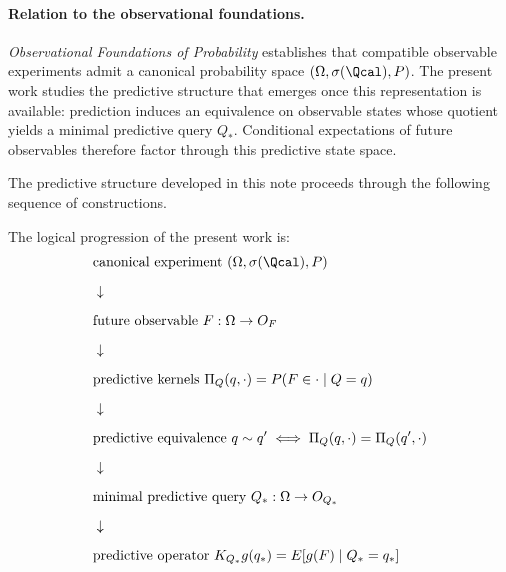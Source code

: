 
\maketitle

\begin{abstract}
Building on the canonical probability space representation established
in \emph{Observational Foundations of Probability}, this work studies
the predictive structure that emerges from compatible observable
experiments.

Given a future observable $F:\Omega\to O_F$, prediction induces an
equivalence relation on observable states determined by equality of
conditional laws.  The resulting quotient defines a minimal predictive
query $Q_*$ whose states correspond exactly to distinct predictive
laws of $F$.  A canonical positive linear operator
\[
(K_{Q_*}g)(q_*) = E[g(F)\mid Q_*=q_*]
\]
then acts on functions of this predictive state space, providing an
observable representation of prediction expressed entirely in terms of
conditional laws.  The minimal predictive query is universal: any
other predictive statistic factors through $Q_*$ via the
Doob--Dynkin lemma, making $Q_*$ the coarsest observable
representation retaining the full predictive law of $F$.
\end{abstract}

\paragraph{Relation to the observational foundations.}
\emph{Observational Foundations of Probability} establishes that
compatible observable experiments admit a canonical probability space
$(\Omega,\sigma(\Qcal),P)$.  The present work studies the predictive
structure that emerges once this representation is available:
prediction induces an equivalence on observable states whose quotient
yields a minimal predictive query $Q_*$.  Conditional expectations of
future observables therefore factor through this predictive state
space.

The predictive structure developed in this note proceeds through the
following sequence of constructions.

The logical progression of the present work is:
\[
\begin{aligned}
&\text{canonical experiment } (\Omega,\sigma(\Qcal),P)\\[6pt]
&\downarrow\\[6pt]
&\text{future observable } F:\Omega\to O_F\\[6pt]
&\downarrow\\[6pt]
&\text{predictive kernels } \Pi_Q(q,\cdot)=P(F\in\cdot\mid Q=q)\\[6pt]
&\downarrow\\[6pt]
&\text{predictive equivalence } q\sim q' \iff \Pi_Q(q,\cdot)=\Pi_Q(q',\cdot)\\[6pt]
&\downarrow\\[6pt]
&\text{minimal predictive query } Q_*:\Omega\to O_{Q_*}\\[6pt]
&\downarrow\\[6pt]
&\text{predictive operator } K_{Q_*}g(q_*)=E[g(F)\mid Q_*=q_*]
\end{aligned}
\]

